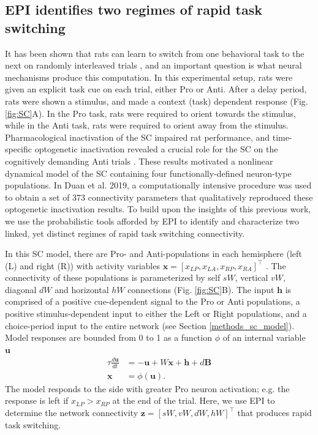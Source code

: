 \documentclass[11pt]{article}
\begin{document}
\subsection{EPI identifies two regimes of rapid task switching} \label{results_SC}
It has been shown that rats can learn to switch from one behavioral task to the next on randomly interleaved trials \cite{duan2015requirement}, and an important question is what neural mechanisms produce this computation.
In this experimental setup, rats were given an explicit task cue on each trial, either Pro or Anti. 
After a delay period, rats were shown a stimulus, and made a context  (task) dependent response (Fig. \ref{fig:SC}A). 
In the Pro task, rats were required to orient towards the stimulus, while in the Anti task, rats were required to orient away from the stimulus.
Pharmacological inactivation of the SC impaired rat performance, and time-specific optogenetic inactivation revealed a crucial role for the SC on the cognitively demanding Anti trials \cite{duan2019collicular}.
These results motivated a nonlinear dynamical model of the SC containing four functionally-defined neuron-type populations.
In Duan et al. 2019, a computationally intensive procedure was used to obtain a set of 373 connectivity parameters that qualitatively reproduced these optogenetic inactivation results.
To build upon the insights of this previous work, we use the probabilistic tools afforded by EPI to identify and characterize two linked, yet distinct regimes of rapid task switching connectivity.

In this SC model, there are Pro- and Anti-populations in each hemisphere (left (L) and right (R)) with activity variables $\mathbf{x} = [x_{LP}, x_{LA}, x_{RP}, x_{RA}]^\top$ \cite{duan2019collicular}.
The connectivity of these populations is parameterized by self $sW$, vertical $vW$, diagonal $dW$ and horizontal $hW$ connections (Fig. \ref{fig:SC}B).
The input $\mathbf{h}$ is comprised of a positive cue-dependent signal to the Pro or Anti populations, a positive stimulus-dependent input to either the Left or Right populations, and a choice-period input to the entire network (see Section \ref{methods_sc_model}).
Model responses are bounded from 0 to 1 as a function $\phi$ of an internal variable $\mathbf{u}$
\begin{equation}
\begin{split}
\tau \frac{d\mathbf{u}}{dt} &= -\mathbf{u} + W\mathbf{x} + \mathbf{h} + d\mathbf{B} \\
\mathbf{x} &= \phi(\mathbf{u}).
\end{split}
\end{equation}
The model responds to the side with greater Pro neuron activation; e.g. the response is left if $x_{LP} > x_{RP}$ at the end of the trial.  
Here, we use EPI to determine the network connectivity $\mathbf{z} = [sW, vW, dW, hW]^{\top}$ that produces rapid task switching.
\end{document}
